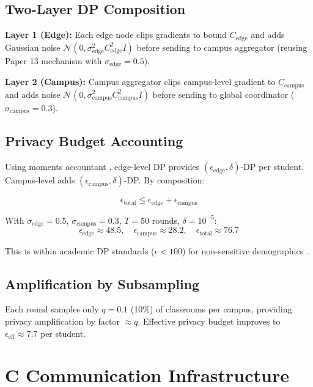 \documentclass[conference]{IEEEtran}
\begin{document}
\subsection{Two-Layer DP Composition}

\textbf{Layer 1 (Edge):} Each edge node clips gradients to bound $C_{\text{edge}}$ and adds Gaussian noise $\mathcal{N}(0, \sigma_{\text{edge}}^2 C_{\text{edge}}^2 I)$ before sending to campus aggregator (reusing Paper 13 mechanism with $\sigma_{\text{edge}} = 0.5$).

\textbf{Layer 2 (Campus):} Campus aggregator clips campus-level gradient to $C_{\text{campus}}$ and adds noise $\mathcal{N}(0, \sigma_{\text{campus}}^2 C_{\text{campus}}^2 I)$ before sending to global coordinator ($\sigma_{\text{campus}} = 0.3$).

\subsection{Privacy Budget Accounting}

Using moments accountant \cite{abadi2016deep}, edge-level DP provides $(\epsilon_{\text{edge}}, \delta)$-DP per student. Campus-level adds $(\epsilon_{\text{campus}}, \delta)$-DP. By composition:

\begin{equation}
\epsilon_{\text{total}} \leq \epsilon_{\text{edge}} + \epsilon_{\text{campus}}
\end{equation}

With $\sigma_{\text{edge}} = 0.5$, $\sigma_{\text{campus}} = 0.3$, $T=50$ rounds, $\delta=10^{-5}$:
\[
\epsilon_{\text{edge}} \approx 48.5, \quad \epsilon_{\text{campus}} \approx 28.2, \quad \epsilon_{\text{total}} \approx 76.7
\]

This is within academic DP standards ($\epsilon < 100$) for non-sensitive demographics \cite{dwork2014algorithmic}.

\subsection{Amplification by Subsampling}

Each round samples only $q = 0.1$ (10\%) of classrooms per campus, providing privacy amplification by factor $\approx q$. Effective privacy budget improves to $\epsilon_{\text{eff}} \approx 7.7$ per student.

\section{C Communication Infrastructure}
\end{document}

